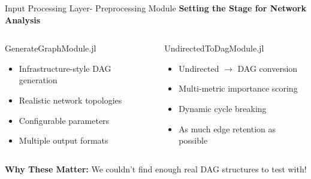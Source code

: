 \documentclass[aspectratio=169]{beamer}
\begin{document}
\begin{frame}{\textcolor{juliagreen}{Input Processing Layer-  Preprocessing Module}}
\textbf{Setting the Stage for Network Analysis}

\vspace{0.2cm}

\begin{columns}
\begin{column}{0.5\textwidth}
\begin{block}{\textcolor{juliagreen}{GenerateGraphModule.jl}}
\small
\begin{itemize}
\item Infrastructure-style DAG generation
\item Realistic network topologies  
\item Configurable parameters
\item Multiple output formats
\end{itemize}
\end{block}
\end{column}
\begin{column}{0.5\textwidth}
\begin{block}{\textcolor{juliagreen}{UndirectedToDagModule.jl}}
\small
\begin{itemize}
\item Undirected $\rightarrow$ DAG conversion
\item Multi-metric importance scoring
\item Dynamic cycle breaking
\item As much edge retention  as possible
\end{itemize}
\end{block}
\end{column}
\end{columns}

\vspace{0.4cm}

\begin{center}
\textbf{Why These Matter:} We couldn't find enough real DAG structures to test with!
\end{center}
\end{frame}
\end{document}
